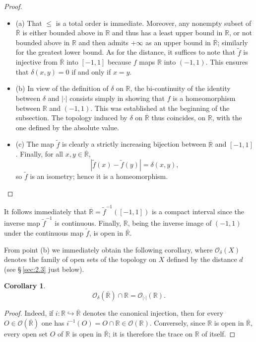 \documentclass[12pt]{article}
\newtheorem{corollary}{Corollary}[section]
\theoremstyle{definition}
\begin{document}
\begin{proof}
\begin{itemize}
\item (a) That $\le$ is a total order is immediate.
Moreover, any nonempty subset of $\overline{\mathbb{R}}$ is either bounded above in $\mathbb{R}$ and thus has a least upper bound in $\mathbb{R}$, or not bounded above in $\mathbb{R}$ and then admits $+\infty$ as an upper bound in $\overline{\mathbb{R}}$; similarly for the greatest lower bound.
As for the distance, it suffices to note that $\tilde f$ is injective from $\overline{\mathbb{R}}$ into $[-1,1]$ because $f$ maps $\mathbb{R}$ into $(-1,1)$.
This ensures that $\delta(x,y)=0$ if and only if $x=y$.

\item (b) In view of the definition of $\delta$ on $\mathbb{R}$, the bi-continuity of the identity between $\delta$ and $|\cdot|$ consists simply in showing that $f$ is a homeomorphism between $\mathbb{R}$ and $(-1,1)$.
This was established at the beginning of the subsection.
The topology induced by $\delta$ on $\overline{\mathbb{R}}$ thus coincides, on $\mathbb{R}$, with the one defined by the absolute value.

\item (c) The map $\tilde f$ is clearly a strictly increasing bijection between $\overline{\mathbb{R}}$ and $[-1,1]$.
Finally, for all $x,y\in\overline{\mathbb{R}}$,
\[
|\tilde f(x)-\tilde f(y)|=\delta(x,y),
\]
so $\tilde f$ is an isometry; hence it is a homeomorphism.
\end{itemize}
\end{proof}

It follows immediately that $\overline{\mathbb{R}}=\tilde f^{-1}([-1,1])$ is a compact interval since the inverse map $\tilde f^{-1}$ is continuous.
Finally, $\mathbb{R}$, being the inverse image of $(-1,1)$ under the continuous map $\tilde f$, is open in $\overline{\mathbb{R}}$.

From point (b) we immediately obtain the following corollary, where $\mathcal{O}_\delta(X)$ denotes the family of open sets of the topology on $X$ defined by the distance $d$ (see \S\,\ref{sec:2.3} just below).

\begin{corollary}
\[
\mathcal{O}_\delta(\overline{\mathbb{R}})\cap \mathbb{R}=\mathcal{O}_{|\cdot|}(\mathbb{R}).
\]
\end{corollary}

\begin{proof}
Indeed, if $i:\mathbb{R}\hookrightarrow \overline{\mathbb{R}}$ denotes the canonical injection, then for every $O\in\mathcal{O}(\overline{\mathbb{R}})$ one has $i^{-1}(O)=O\cap\mathbb{R}\in\mathcal{O}(\mathbb{R})$.
Conversely, since $\mathbb{R}$ is open in $\overline{\mathbb{R}}$, every open set $O$ of $\mathbb{R}$ is open in $\overline{\mathbb{R}}$; it is therefore the trace on $\mathbb{R}$ of itself.
\end{proof}
\end{document}

